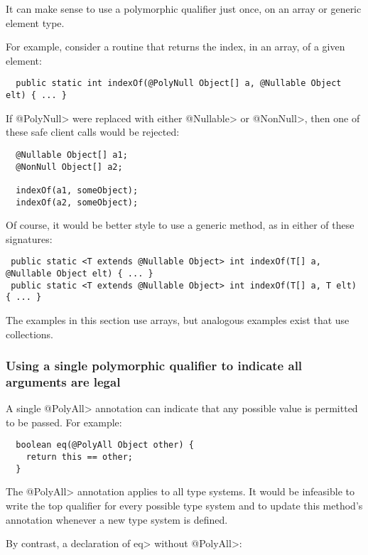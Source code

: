 It can make sense to use a polymorphic qualifier just once, on an array or
generic element type.

For example, consider a routine that returns the index, in an array, of a
given element:

\begin{Verbatim}
  public static int indexOf(@PolyNull Object[] a, @Nullable Object elt) { ... }
\end{Verbatim}

If \<@PolyNull> were replaced with either \<@Nullable> or \<@NonNull>, then
one of these safe client calls would be rejected:

\begin{Verbatim}
  @Nullable Object[] a1;
  @NonNull Object[] a2;

  indexOf(a1, someObject);
  indexOf(a2, someObject);
\end{Verbatim}

Of course, it would be better style to use a generic method, as in either
of these signatures:

\begin{Verbatim}
 public static <T extends @Nullable Object> int indexOf(T[] a, @Nullable Object elt) { ... }
 public static <T extends @Nullable Object> int indexOf(T[] a, T elt) { ... }
\end{Verbatim}

The examples in this section use arrays, but analogous examples exist that
use collections.


\subsubsection{Using a single polymorphic qualifier to indicate all
  arguments are legal\label{qualifier-polymorphism-top-type}}

A single \<@PolyAll> annotation can indicate that any possible value is
permitted to be passed.  For example:

\begin{Verbatim}
  boolean eq(@PolyAll Object other) {
    return this == other;
  }
\end{Verbatim}

\noindent
The \<@PolyAll> annotation applies to all type systems.
It would be infeasible to write the top qualifier for every possible type
system and to update this method's annotation whenever a new type system is
defined.

By contrast, a declaration of \<eq> without \<@PolyAll>:

